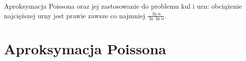 {
\makeatletter
{}
\makeatother
\graphicspath{{../probabil}}

\begin{questiontext}
	Aproksymacja Poissona oraz jej zastosowanie do problemu kul i urn: obciążenie najcięższej urny jest prawie zawsze co najmniej \(\frac{\ln n}{\ln \ln n}\).
\end{questiontext}

\section{Aproksymacja Poissona}
 {
 }
}